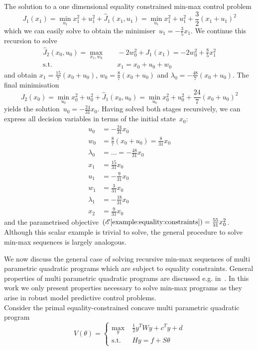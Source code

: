 \begin{example}{The solution to a one dimensional equality constrained min-max control problem}
%
$$
J_1(x_1) = \min_{u_1} x_1^2+u_1^2+ \hat J_1(x_1,u_1) =  \min_{u_1} x_1^2+u_1^2+ \frac{3}{2}(x_1+u_1)^2
$$
%
which we can easily solve to obtain the minimiser~$u_1 = -\frac{3}{5}x_1$.
%
We continue this recursion to solve 
%
$$\begin{aligned}
	\hat J_2(x_0,u_0) = \max_{x_1,w_0}&\quad -2w_0^2+J_1(x_1) = -2w_0^2+\frac{8}{5}x_1^2\\
	\text{s.t.}&\quad x_1 = x_0+u_0+w_0
\end{aligned}$$
%
and obtain $x_1 = \frac{15}{7}(x_0+u_0)$, $w_0 = \frac{8}{7}(x_0+u_0)$ and $\lambda_0 = -\frac{48}{7}(x_0+u_0)$.
%
The final minimisation 
%
$$
J_2(x_0) = \min_{u_0} x_0^2+u_0^2+ \hat J_1(x_0,u_0) =  \min_{u_0} x_0^2+u_0^2+ \frac{24}{7}(x_0+u_0)^2
$$
%
yields the solution~$u_0 = -\frac{24}{31}x_0$.
%
Having solved both stages recursively, we can express all decision variables in terms of the initial state~$x_0$:
%
$$
\begin{aligned}
u_0 &= -\frac{24}{31}x_0\\
w_0 &= \frac{8}{7}(x_0+u_0) = \frac{8}{31}x_0\\
\lambda_0 &= \dots = -\frac{48}{31}x_0\\
x_1 &= \frac{15}{31}x_0\\
u_1 &= -\frac{9}{31}x_0\\
w_1 &= \frac{3}{31}x_0\\
\lambda_1 &=-\frac{18}{31}x_0\\
x_2 &=\frac{9}{31}x_0
\end{aligned}
$$
%
and the parametrised objective~$(\mathscr E\ref{example:equality:constraints})=\frac{55}{31}x_0^2$.
%
Although this scalar example is trivial to solve, the general procedure to solve min-max sequences is largely analogous.
\end{example}
%
\noindent\mysplit We now discuss the general case of solving recursive min-max sequences of multi parametric quadratic programs which are subject to equality constraints.
%
General properties of multi parametric quadratic programs are discussed e.g. in~\cite{Tondel:2003,Bemporad:2002}.
%
In this work we only present properties necessary to solve min-max programs as they arise in robust model predictive control problems.
\\[1em]
Consider the primal equality-constrained concave multi parametric quadratic program
%
\begin{equation}\label{mpQP:primal}
	V(\theta) = \left\{\begin{aligned}
	\max_{y} & \;\frac{1}{2} y^T W y + c^Ty + d\\
	\text{s.t.} &\; Hy  = f +S\theta
	\end{aligned}\right.
\end{equation}

